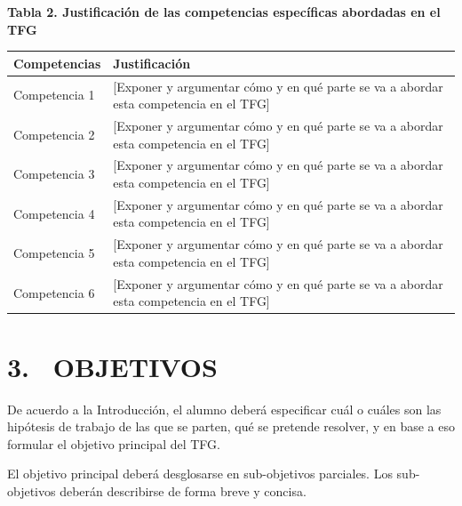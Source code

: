 \documentclass[a4paper]{article}
\begin{document}
\bigskip
{\centering\bfseries
Tabla 2. Justificaci\'on de las competencias espec\'ificas abordadas en el TFG
\par}
\begin{center}
  \begin{tabular}{m{8.849cm}m{7.605cm}}

    \rowcolor{gray!50}
	{\color{black} \textbf{Competencias}} &
	{\color{black} \textbf{Justificaci\'on}}\\\hline
    
    {\color{black} Competencia 1} &
    {\color{black} [Exponer y argumentar c\'omo y en qu\'e parte se va a abordar esta competencia en el TFG]}\\
    
    \rowcolor{gray!30}
    {\color{black} Competencia 2} &
    {\color{black} [Exponer y argumentar c\'omo y en qu\'e parte se va a abordar esta competencia en el TFG]}\\
    
    {\color{black} Competencia 3} &
    {\color{black} [Exponer y argumentar c\'omo y en qu\'e parte se va a abordar esta competencia en el TFG]}\\
    
    \rowcolor{gray!30}
    {\color{black} Competencia 4} &
    {\color{black} [Exponer y argumentar c\'omo y en qu\'e parte se va a abordar esta competencia en el TFG]}\\
    
    {\color{black} Competencia 5} &
    {\color{black} [Exponer y argumentar c\'omo y en qu\'e parte se va a abordar esta competencia en el TFG]}\\
    
    \rowcolor{gray!30}
    {\color{black} Competencia 6} &
    {\color{black} [Exponer y argumentar c\'omo y en qu\'e parte se va a abordar esta competencia en el TFG]}\\
  \end{tabular}
\end{center}
\bigskip

\section{3. \ OBJETIVOS}
De acuerdo a la Introducci\'on, el alumno deber\'a especificar cu\'al o cuáles son las hip\'otesis de trabajo de las
que se parten, qu\'e se pretende resolver, y en base a eso formular el objetivo principal del TFG.

El objetivo principal deber\'a desglosarse en sub-objetivos parciales. Los sub-objetivos deberán describirse de forma breve y concisa.
\end{document}
